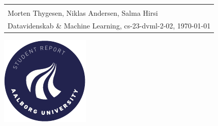 \begin{titlepage}
{{\begin{tabular}{@{}p{\textwidth}@{}}
\begin{center}
    \end{center}
    \vspace{0.2cm}
   \begin{center}
    {\Large
    Daniel Johnsen, Gonde Winkelmann, Linda Knudsen\\ Morten Thygesen, Niklas Andersen, Salma Hirsi%
    }\\
    \vspace{0.2cm}
    {\large
      Datavidenskab \& Machine Learning, cs-23-dvml-2-02, \today%
    }
   \end{center}
   \vspace{0.2cm}
   \begin{center}
    {\Large
      P2 projekt
    }
   \end{center}
  \end{tabular}}}
  \vfill
  \begin{center}
    \includegraphics[width=0.2\paperwidth]{AAUgraphics/aau_logo_circle_en}%
  \end{center}
\end{titlepage}
\clearpage
